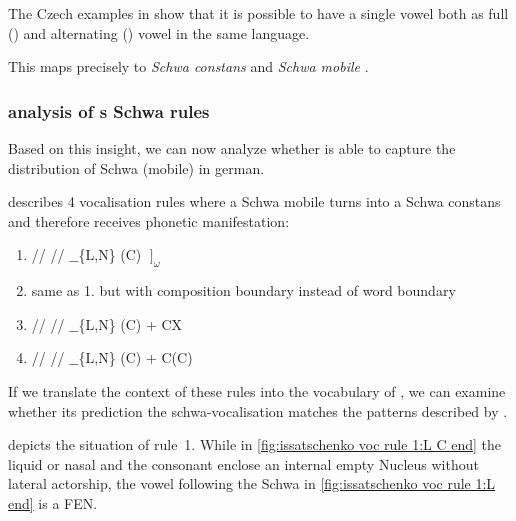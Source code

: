 The Czech examples in  show that it is possible
to have a single vowel both as full () and alternating ()
vowel in the same language.

This maps precisely to \emph{Schwa constans} and \emph{Schwa mobile}
\cite{issatschenko1974}.

\subsubsection{\CVCV analysis of \citeauthor{issatschenko1974}s Schwa rules}
Based on this insight, we can now analyze whether \CVCV is able to capture
the distribution of Schwa (mobile) in german.

\citeauthor{issatschenko1974} describes 4 vocalisation rules where
a Schwa mobile turns into a Schwa constans and therefore receives
phonetic manifestation:

\begin{enumerate}
  \item \deriv
    {/\schwaMobi/}    %
    {/\schwaCons/}    %
    {$\_\_$\{L,N\} (C) $\;\big]_\omega$}
  \item same as 1. but with composition boundary instead of word boundary
  \item \deriv
    {/\schwaMobi/}    %
    {/\schwaCons/}    %
    {$\_\_$\{L,N\} (C) + CX}
  \item \deriv
    {/\schwaMobi/}    %
    {/\schwaCons/}    %
    {$\_\_$\{L,N\} (C) + \schwaMobi C(C)}
\end{enumerate}

If we translate the context of these rules into the
vocabulary of \CVCV, we can examine whether its prediction
 the schwa-vocalisation matches the patterns
described by \citeauthor{issatschenko1974}.

depicts the situation of rule~1.
While in \ref{fig:issatschenko voc rule 1:L C end}
the liquid or nasal and the consonant enclose an
internal empty Nucleus without lateral actorship,
the vowel following the Schwa in
\ref{fig:issatschenko voc rule 1:L end}
is a \gls{FEN}.

